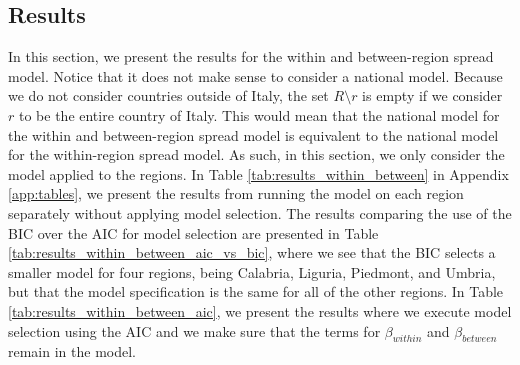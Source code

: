 \documentclass[12pt]{article}
\begin{document}
	\subsection{Results} \label{subsec:results_within_between}
	In this section, we present the results for the within and between-region spread model. Notice that it does not make sense to consider a national model. Because we do not consider countries outside of Italy, the set $R \setminus r$ is empty if we consider $r$ to be the entire country of Italy. This would mean that the national model for the within and between-region spread model is equivalent to the national model for the within-region spread model. As such, in this section, we only consider the model applied to the regions. In Table \ref{tab:results_within_between} in Appendix \ref{app:tables}, we present the results from running the model on each region separately without applying model selection. The results comparing the use of the BIC over the AIC for model selection are presented in Table \ref{tab:results_within_between_aic_vs_bic}, where we see that the BIC selects a smaller model for four regions, being Calabria, Liguria, Piedmont, and Umbria, but that the model specification is the same for all of the other regions. In Table \ref{tab:results_within_between_aic}, we present the results where we execute model selection using the AIC and we make sure that the terms for $\beta_{within}$ and $\beta_{between}$ remain in the model. \\
	
\end{document}
